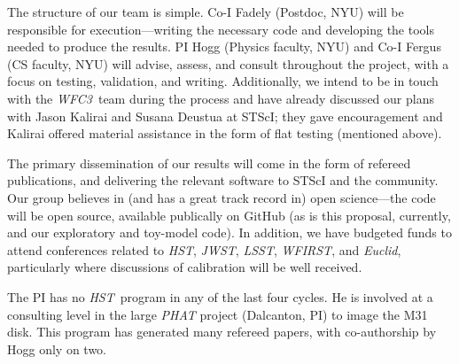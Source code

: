 \documentclass[12pt]{article}
\newcommand{\project}[1]{\textsl{#1}}
\newcommand{\HST}{\project{HST}}
\newcommand{\WFC}{\project{WFC3}}
\begin{document}
The structure of our team is simple.  Co-I Fadely (Postdoc, NYU) will
be responsible for execution---writing the necessary code and
developing the tools needed to produce the results.  PI Hogg (Physics
faculty, NYU) and Co-I Fergus (CS faculty, NYU) will advise, assess,
and consult throughout the project, with a focus on testing,
validation, and writing.  Additionally, we intend to be in touch with
the \WFC\ team during the process and have already discussed our plans
with Jason Kalirai and Susana Deustua at STScI; they gave
encouragement and Kalirai offered material assistance in the form of
flat testing (mentioned above).

The primary dissemination of our results will come in the form of
refereed publications, and delivering the relevant software to STScI
and the community.  Our group believes in (and has a great track
record in) open science---the code will be open source, available
publically on GitHub (as is this proposal, currently, and our
exploratory and toy-model code).  In addition, we have budgeted funds
to attend conferences related to \HST, \project{JWST}, \project{LSST},
\project{WFIRST}, and \project{Euclid}, particularly where discussions
of calibration will be well received.


%
%
%
\pasthstusage  %

The PI has no \HST\ program in any of the last four cycles.  He is
involved at a consulting level in the large \project{PHAT} project
(Dalcanton, PI) to image the M31 disk.  This program has generated
many refereed papers, with co-authorship by Hogg only on two.

%
%




\end{document}
